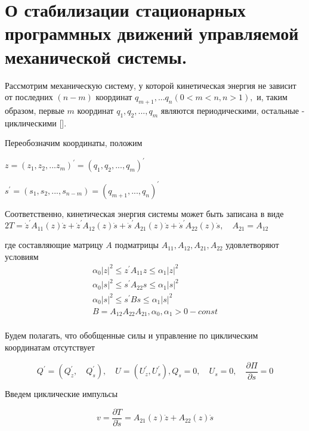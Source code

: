 \section{О стабилизации стационарных программных движений управляемой механической системы.} \label{p13}

Рассмотрим механическую систему, у которой кинетическая энергия не зависит от последних $(n-m)$ координат $q_{m+1},... q_n (0 < m < n, n > 1),$ и, таким образом, первые $m$ координат $q_1, q_2, ... , q_m$ являются периодическими, остальные - циклическими [].

Переобозначим координаты, положим

$z = (z_1, z_2, ... z_m)^{'} = (q_1, q_2, ..., q_m)^{'}$

$s^{'} = (s_1, s_2, ... , s_{n-m}) = (q_{m + 1}, ..., q_n)^{'}$

Соответственно, кинетическая энергия системы может быть записана в виде $2T = \dot z^{'} A_{11} (z) \dot z + \dot z^{'} A_{12} (z) \dot s + \dot s^{'} A_{21} (z) \dot z + \dot s^{'} A_{22} (z) \dot s, \quad A_{21} = A_{12}$

где составляющие матрицу $A$ подматрицы $A_{11}, A_{12}, A_{21}, A_{22}$ удовлетворяют условиям 
$$
\begin{array}{l}
\alpha_0 \left| z \right|^2 \le z^{'} A_{11} z \le \alpha_1  \left| z \right|^2\\
\alpha_0 \left| s \right|^2 \le s^{'} A_{22} s \le \alpha_1  \left| s \right|^2\\
\alpha_0 \left| s \right|^2 \le s^{'} B s \le \alpha_1  \left| s \right|^2\\
B = A_{12} A_{22} A_{21}, \alpha_0, \alpha_1 > 0 - const\\
\end{array}
$$

Будем полагать, что обобщенные силы и управление по циклическим координатам отсутствует

\begin{equation} \label{1.31'}
Q^{'} = (Q_{z}^{'}, \quad Q_{s}^{'}), \quad U = (U_{z}^{'}, U_{s}^{'}), Q_s = 0, \quad U_s = 0, \quad \frac{\partial \Pi}{\partial s} = 0
\end{equation}

Введем циклические импульсы

\begin{equation} \label{1.32'}
v = \frac{\partial T}{\partial \dot s} = A_{21} (z) \dot z + A_{22} (z) \dot s
\end{equation}

